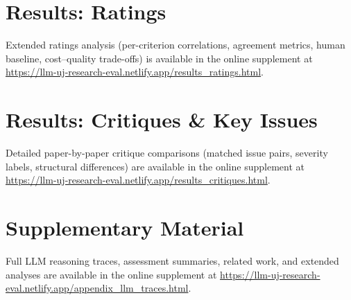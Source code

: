\documentclass[
  11pt,
  letterpaper,
]{article}
\begin{document}
\cleardoublepage
{}
{}
\appendix

\section{Results: Ratings}\label{results-ratings}

Extended ratings analysis (per-criterion correlations, agreement
metrics, human baseline, cost--quality trade-offs) is available in the
online supplement at
\url{https://llm-uj-research-eval.netlify.app/results_ratings.html}.

\section{Results: Critiques \& Key
Issues}\label{results-critiques-key-issues}

Detailed paper-by-paper critique comparisons (matched issue pairs,
severity labels, structural differences) are available in the online
supplement at
\url{https://llm-uj-research-eval.netlify.app/results_critiques.html}.

\section{Supplementary Material}\label{supplementary-material}

Full LLM reasoning traces, assessment summaries, related work, and
extended analyses are available in the online supplement at
\url{https://llm-uj-research-eval.netlify.app/appendix_llm_traces.html}.
\end{document}
